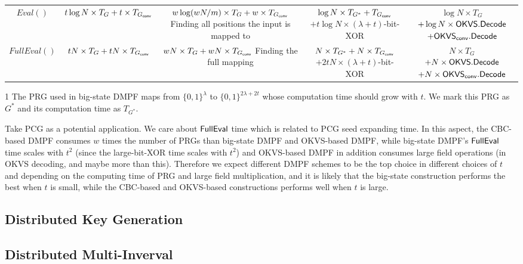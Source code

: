 \begin{table*}
{\begin{threeparttable}
\begin{tabular}{ccccc}
        \cline{1-5}

				$Eval()$ & $t\log N\times T_G+t\times T_{G_{\sf conv}}$ &\makecell{$w\log(wN/m)\times T_G + w\times T_{G_{\sf conv}}$\\Finding all positions the input is mapped to} & \makecell{$\log N\times T_{G^*} + T_{G_{\sf conv}}$\\$+t\log N \times (\lambda+t)$-bit-XOR}&\makecell{$\log N\times T_G$ \\$+\log N\times{\sf OKVS}.{\sf Decode}$\\ $+\OKVS_{\sf conv}.\Decode$} \\

        \cline{1-5}

				$FullEval()$ & $tN\times T_G+tN\times T_{G_{\sf conv}}$ &\makecell{$wN\times T_G+ wN\times T_{G_{\sf conv}}$\\Finding the full mapping} & \makecell{$N\times T_{G^*} + N\times T_{G_{\sf conv}}$\\$+2tN\times (\lambda+t)$-bit-XOR }& \makecell{$N\times T_G$ \\ $+N\times{\sf OKVS}.{\sf Decode}$\\$+N\times {\sf OKVS}_{\sf conv}.{\sf Decode}$} \\
        \bottomrule
			\end{tabular}	
      \begin{tablenotes}
        \item [1] The PRG used in big-state DMPF maps from $\{0,1\}^\lambda$ to $\{0,1\}^{2\lambda+2t}$ whose computation time should grow with $t$. We mark this PRG as $G^*$ and its computation time as $T_{G^*}$. 
        \end{tablenotes}
    \end{threeparttable}
    }
	\end{table*}

Take PCG as a potential application. We care about ${\sf FullEval}$ time which is related to PCG seed expanding time. In this aspect, the CBC-based DMPF consumes $w$ times the number of PRGs than big-state DMPF and OKVS-based DMPF, while big-state DMPF's ${\sf FullEval}$ time scales with $t^2$ (since the large-bit-XOR time scales with $t^2$) and OKVS-based DMPF in addition consumes large field operations (in OKVS decoding, and maybe more than this). Therefore we expect different DMPF schemes to be the top choice in different choices of $t$ and depending on the computing time of PRG and large field multiplication, and it is likely that the big-state construction performs the best when $t$ is small, while the CBC-based and OKVS-based constructions performs well when $t$ is large. 

  
\subsection{Distributed Key Generation}
\subsection{Distributed Multi-Inverval}